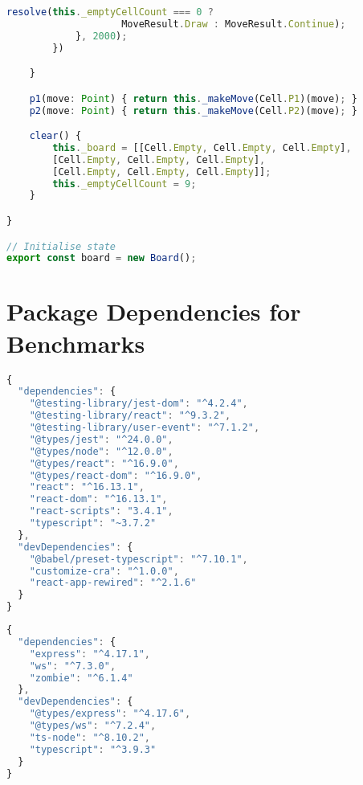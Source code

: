 \begin{lstlisting}[language=javascript,tabsize=2]
				resolve(this._emptyCellCount === 0 ? 
					MoveResult.Draw : MoveResult.Continue);
			}, 2000);
		})

	}

	p1(move: Point) { return this._makeMove(Cell.P1)(move); }
	p2(move: Point) { return this._makeMove(Cell.P2)(move); }

	clear() {
		this._board = [[Cell.Empty, Cell.Empty, Cell.Empty],
		[Cell.Empty, Cell.Empty, Cell.Empty],
		[Cell.Empty, Cell.Empty, Cell.Empty]];
		this._emptyCellCount = 9;
	}

}

// Initialise state
export const board = new Board();
\end{lstlisting}



\section{Package Dependencies for Benchmarks}
\label{section:evalbenchmarkpackagejson}

\begin{lstlisting}[language=javascript,tabsize=2,
title=Packages for Ping Pong Client]
{
  "dependencies": {
    "@testing-library/jest-dom": "^4.2.4",
    "@testing-library/react": "^9.3.2",
    "@testing-library/user-event": "^7.1.2",
    "@types/jest": "^24.0.0",
    "@types/node": "^12.0.0",
    "@types/react": "^16.9.0",
    "@types/react-dom": "^16.9.0",
    "react": "^16.13.1",
    "react-dom": "^16.13.1",
    "react-scripts": "3.4.1",
    "typescript": "~3.7.2"
  },
  "devDependencies": {
    "@babel/preset-typescript": "^7.10.1",
    "customize-cra": "^1.0.0",
    "react-app-rewired": "^2.1.6"
  }
}
\end{lstlisting}

\begin{lstlisting}[language=javascript,tabsize=2,
title=Packages for Ping Pong Server]
{
  "dependencies": {
    "express": "^4.17.1",
    "ws": "^7.3.0",
    "zombie": "^6.1.4"
  },
  "devDependencies": {
    "@types/express": "^4.17.6",
    "@types/ws": "^7.2.4",
    "ts-node": "^8.10.2",
    "typescript": "^3.9.3"
  }
}
\end{lstlisting}